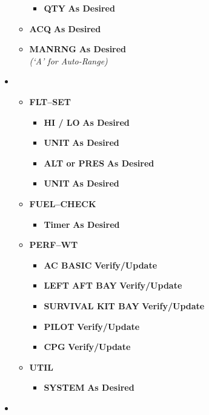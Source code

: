 \documentclass[fontHelvetica]{TechCheck}
\begin{document}
\begin{itemize}[leftmargin=0.1\linewidth,rightmargin=0.1\linewidth, itemsep=4pt]
\begin{itemize}[itemsep=4pt]
\begin{itemize}[itemsep=4pt]
				\item \textbf{QTY} \dotfill \textbf{As Desired}
			\end{itemize}
			\item \textbf{ACQ} \dotfill \textbf{As Desired}
			\item \textbf{MANRNG} \dotfill \textbf{As Desired} \\
			\hfill \emph{(`A' for Auto-Range)}
		\end{itemize}
		\item {}
		\begin{itemize}
			\item \textbf{FLT--SET}
			\begin{itemize}[itemsep=4pt]
				\item \textbf{HI / LO} \dotfill \textbf{As Desired}
				\item \textbf{UNIT} \dotfill \textbf{As Desired}
				\item \textbf{ALT or PRES} \dotfill \textbf{As Desired}
				\item \textbf{UNIT} \dotfill \textbf{As Desired}
			\end{itemize}
			\item \textbf{FUEL--CHECK}
			\begin{itemize}[itemsep=4pt]
				\item \textbf{Timer} \dotfill \textbf{As Desired}
			\end{itemize}
			\item \textbf{PERF--WT}
			\begin{itemize}[itemsep=4pt]
				\item \textbf{AC BASIC} \dotfill \textbf{Verify/Update}
				\item \textbf{LEFT AFT BAY} \dotfill \textbf{Verify/Update}
				\item \textbf{SURVIVAL KIT BAY} \dotfill \textbf{Verify/Update}
				\item \textbf{PILOT} \dotfill \textbf{Verify/Update}
				\item \textbf{CPG} \dotfill \textbf{Verify/Update}
			\end{itemize}
			\item \textbf{UTIL}
			\begin{itemize}[itemsep=4pt]
				\item \textbf{SYSTEM} \dotfill \textbf{As Desired}
			\end{itemize}
		\end{itemize}
		\item {}
		\begin{itemize}[itemsep=4pt]

\end{itemize}
\end{itemize}
\end{document}
